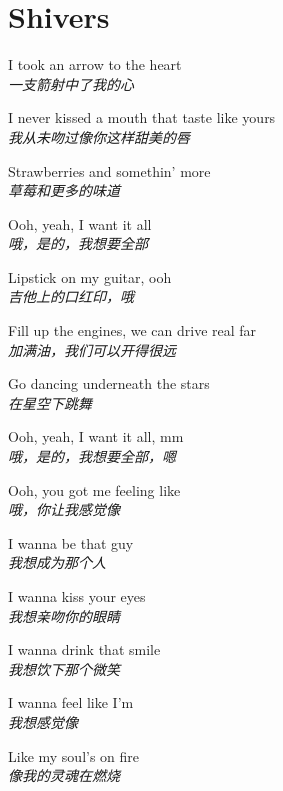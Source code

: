 \section{Shivers}

\thispagestyle{empty}


\begin{spacing}{1.5}
\begin{flushleft}
I took an arrow to the heart\\
\textit{一支箭射中了我的心}\lyricspace

I never kissed a mouth that taste like yours\\
\textit{我从未吻过像你这样甜美的唇}\lyricspace

Strawberries and somethin' more\\
\textit{草莓和更多的味道}\lyricspace

Ooh, yeah, I want it all\\
\textit{哦，是的，我想要全部}\lyricspace

Lipstick on my guitar, ooh\\
\textit{吉他上的口红印，哦}\lyricspace

Fill up the engines, we can drive real far\\
\textit{加满油，我们可以开得很远}\lyricspace

Go dancing underneath the stars\\
\textit{在星空下跳舞}\lyricspace

Ooh, yeah, I want it all, mm\\
\textit{哦，是的，我想要全部，嗯}\lyricspace

Ooh, you got me feeling like\\
\textit{哦，你让我感觉像}\lyricspace

I wanna be that guy\\
\textit{我想成为那个人}\lyricspace

I wanna kiss your eyes\\
\textit{我想亲吻你的眼睛}\lyricspace

I wanna drink that smile\\
\textit{我想饮下那个微笑}\lyricspace

I wanna feel like I'm\\
\textit{我想感觉像}\lyricspace

Like my soul's on fire\\
\textit{像我的灵魂在燃烧}\lyricspace


\end{flushleft}
\end{spacing}
